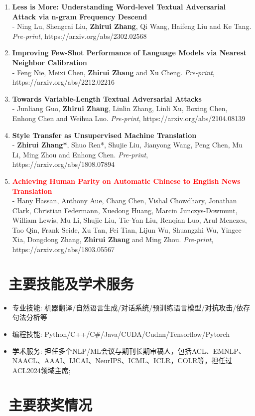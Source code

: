\documentclass{resume}
\begin{document}
\begin{enumerate}

\item \normalsize \textbf{Less is More: Understanding Word-level Textual Adversarial Attack via n-gram Frequency Descend}\\
\small - Ning Lu, Shengcai Liu, \textbf{Zhirui Zhang}, Qi Wang, Haifeng Liu and Ke Tang. \textit{Pre-print}, https://arxiv.org/abs/2302.02568

\item \normalsize \textbf{Improving Few-Shot Performance of Language Models via Nearest Neighbor Calibration}\\
\small - Feng Nie, Meixi Chen, \textbf{Zhirui Zhang} and Xu Cheng. \textit{Pre-print}, https://arxiv.org/abs/2212.02216

\item \normalsize \textbf{Towards Variable-Length Textual Adversarial Attacks}\\
\small - Junliang Guo, \textbf{Zhirui Zhang}, Linlin Zhang, Linli Xu, Boxing Chen, Enhong Chen and Weihua Luo. \textit{Pre-print}, https://arxiv.org/abs/2104.08139 

\item \normalsize \textbf{Style Transfer as Unsupervised Machine Translation} \\
\small - \textbf{Zhirui Zhang*}, Shuo Ren*, Shujie Liu, Jianyong Wang, Peng Chen, Mu Li, Ming Zhou and Enhong Chen. \textit{Pre-print}, https://arxiv.org/abs/1808.07894

\item \normalsize \textcolor{red}{\textbf{Achieving Human Parity on Automatic Chinese to English News Translation}} \\
\small - Hany Hassan, Anthony Aue, Chang Chen, Vishal Chowdhary, Jonathan Clark, Christian Federmann, Xuedong Huang, Marcin Junczys-Dowmunt, William Lewis, Mu Li, Shujie Liu, Tie-Yan Liu, Renqian Luo, Arul Menezes, Tao Qin, Frank Seide, Xu Tan, Fei Tian, Lijun Wu, Shuangzhi Wu, Yingce Xia, Dongdong Zhang, \textbf{Zhirui Zhang} and Ming Zhou. \textit{Pre-print}, https://arxiv.org/abs/1803.05567 

\end{enumerate}

\section{\faCogs\ 主要技能及学术服务}
\begin{itemize}
  \item 专业技能: 机器翻译/自然语言生成/对话系统/预训练语言模型/对抗攻击/依存句法分析等
  \item 编程技能: Python/C++/C\#/Java/CUDA/Cudnn/Tensorflow/Pytorch
  \item 学术服务: 担任多个NLP/ML会议与期刊长期审稿人，包括ACL、EMNLP、NAACL、AAAI、IJCAI、NeurIPS、ICML、ICLR，COLR等，担任过ACL2024领域主席;
\end{itemize}

\section{\faHeartO\ 主要获奖情况}

%
%
\end{document}
